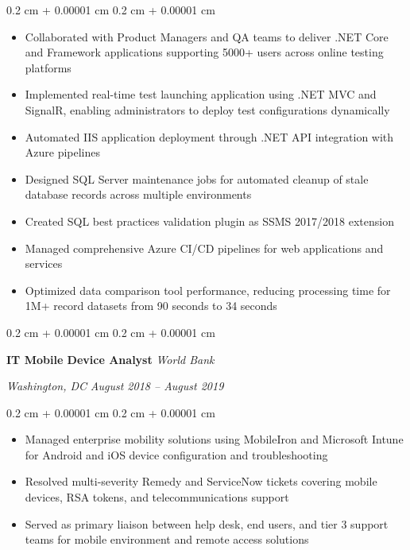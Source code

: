 \documentclass[10pt, letterpaper]{article}
\newenvironment{highlights}{
    \begin{itemize}[
        topsep=0.10 cm,
        parsep=0.10 cm,
        partopsep=0pt,
        itemsep=0pt,
        leftmargin=0.4 cm + 10pt
        ]
    }{
\end{itemize}
} %
\newenvironment{onecolentry}{
    \begin{adjustwidth}{
            0.2 cm + 0.00001 cm
        }{
            0.2 cm + 0.00001 cm
        }
    }{
    \end{adjustwidth}
} %
\newenvironment{twocolentry}[2][]{
    \onecolentry
    \def\secondColumn{#2}
    \setcolumnwidth{\fill, 10.5 cm}
    \begin{paracol}{2}
    }{
        \switchcolumn \raggedleft \secondColumn
    \end{paracol}
    \endonecolentry
} %
\begin{document}
    \vspace{0.10 cm}
    \begin{onecolentry}
        \begin{highlights}
        \item Collaborated with Product Managers and QA teams to deliver .NET Core and Framework applications supporting 5000+ users across online testing platforms
        \item Implemented real-time test launching application using .NET MVC and SignalR, enabling administrators to deploy test configurations dynamically
        \item Automated IIS application deployment through .NET API integration with Azure pipelines
        \item Designed SQL Server maintenance jobs for automated cleanup of stale database records across multiple environments
        \item Created SQL best practices validation plugin as SSMS 2017/2018 extension
        \item Managed comprehensive Azure CI/CD pipelines for web applications and services
        \item Optimized data comparison tool performance, reducing processing time for 1M+ record datasets from 90 seconds to 34 seconds
        \end{highlights}
    \end{onecolentry}
    \begin{twocolentry}{
        \textit{Washington, DC}
        \textit{August 2018 – August 2019}}
        \textbf{IT Mobile Device Analyst}
        \newline
        \textit{World Bank}
    \end{twocolentry}
    \vspace{0.10 cm}
    \begin{onecolentry}
        \begin{highlights}
        \item Managed enterprise mobility solutions using MobileIron and Microsoft Intune for Android and iOS device configuration and troubleshooting
        \item Resolved multi-severity Remedy and ServiceNow tickets covering mobile devices, RSA tokens, and telecommunications support
        \item Served as primary liaison between help desk, end users, and tier 3 support teams for mobile environment and remote access solutions
        \end{highlights}
    \end{onecolentry}
\end{document}
